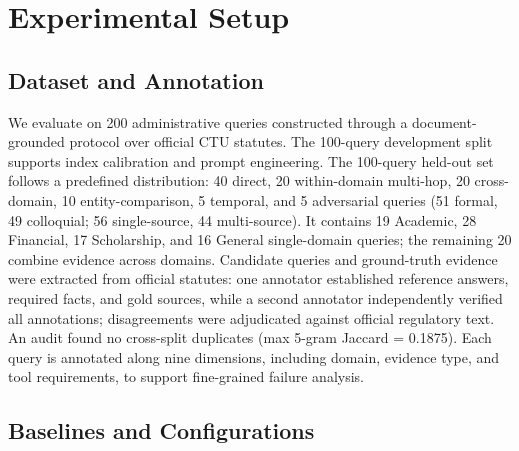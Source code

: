 \section{Experimental Setup}
\label{sec:exp_setup}

\subsection{Dataset and Annotation}
\label{sec:dataset}

We evaluate \system{} on 200 administrative queries constructed through a document-grounded protocol over official CTU statutes. The 100-query development split supports index calibration and prompt engineering. The 100-query held-out set follows a predefined distribution: 40 direct, 20 within-domain multi-hop, 20 cross-domain, 10 entity-comparison, 5 temporal, and 5 adversarial queries (51 formal, 49 colloquial; 56 single-source, 44 multi-source). It contains 19 Academic, 28 Financial, 17 Scholarship, and 16 General single-domain queries; the remaining 20 combine evidence across domains. Candidate queries and ground-truth evidence were extracted from official statutes: one annotator established reference answers, required facts, and gold sources, while a second annotator independently verified all annotations; disagreements were adjudicated against official regulatory text. An audit found no cross-split duplicates (max 5-gram Jaccard = 0.1875). Each query is annotated along nine dimensions, including domain, evidence type, and tool requirements, to support fine-grained failure analysis.

\subsection{Baselines and Configurations}
\label{sec:baselines}

